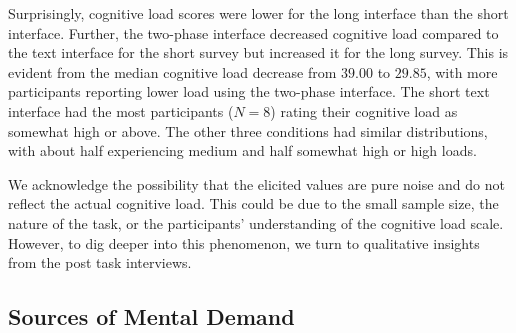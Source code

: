
Surprisingly, cognitive load scores were lower for the long interface than the short interface. Further, the two-phase interface decreased cognitive load compared to the text interface for the short survey but increased it for the long survey. This is evident from the median cognitive load decrease from $39.00$ to $29.85$, with more participants reporting lower load using the two-phase interface. The short text interface had the most participants ($N=8$) rating their cognitive load as somewhat high or above. The other three conditions had similar distributions, with about half experiencing medium and half somewhat high or high loads.

We acknowledge the possibility that the elicited values are pure noise and do not reflect the actual cognitive load. This could be due to the small sample size, the nature of the task, or the participants' understanding of the cognitive load scale. However, to dig deeper into this phenomenon, we turn to qualitative insights from the post task interviews.

\subsection{Sources of Mental Demand}
\label{sec:mental}

